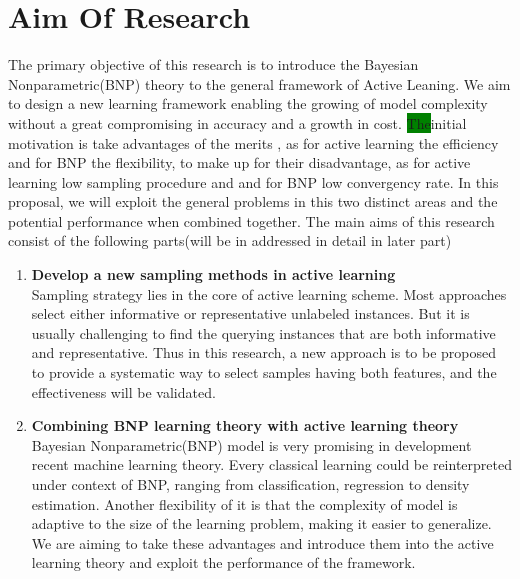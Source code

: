 \section{Aim Of Research}\label{aor}
The primary objective of this research is to introduce the Bayesian Nonparametric(BNP) theory to the general framework of Active Leaning. We aim to design a new learning framework enabling the growing of model complexity without a great compromising in accuracy and a growth in cost.
\colorbox{green}{The}initial motivation is take advantages of the merits , as for active learning the efficiency and for BNP the flexibility, to make up for their disadvantage, as for active learning low sampling procedure and and for BNP low convergency rate\cite{gershman2012tutorial,escobar1995bayesian,Settles2010}. In this proposal, we will exploit the general problems in this two distinct areas and the  potential performance when combined together.  The main aims of this research consist of the following parts(will be in addressed in detail in later part) 
\begin{enumerate}
\item{\textbf{Develop a new sampling methods in active learning}}\\
 Sampling strategy lies in the core of active learning scheme. Most approaches select either informative or representative unlabeled instances. But it is usually challenging to find the querying instances that are both informative and representative. Thus in this research, a new approach is to be proposed to provide a systematic way to select samples having both features, and the effectiveness will be validated.
\item{\textbf{Combining BNP learning theory with active learning theory  }}\\

 Bayesian Nonparametric(BNP) model is very promising in development recent machine learning theory. Every classical learning could be reinterpreted under context of BNP, ranging from classification, regression to density estimation. Another flexibility of it is that the complexity of model is adaptive to the size of the learning problem, making it easier to generalize. We are aiming to take these advantages and introduce them into the active learning theory and exploit the performance of the framework.  
\end{enumerate}

